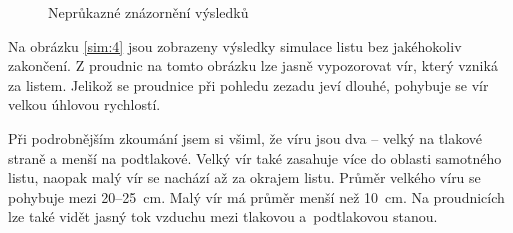 \begin{figure}[H]
		\caption{Neprůkazné znázornění výsledků}
	\end{figure}


Na obrázku \ref{sim:4} jsou zobrazeny výsledky simulace listu bez jakéhokoliv zakončení. Z proudnic na tomto obrázku lze jasně vypozorovat vír, který vzniká za listem. Jelikož se proudnice při pohledu zezadu jeví dlouhé, pohybuje se vír velkou úhlovou rychlostí.

Při podrobnějším zkoumání jsem si všiml, že víru jsou dva – velký na tlakové straně a menší na podtlakové. Velký vír také zasahuje více do oblasti samotného listu, naopak malý vír se nachází až za okrajem listu. Průměr velkého víru se pohybuje mezi 20–25~cm. Malý vír má průměr menší než 10~cm. Na proudnicích lze také vidět jasný tok vzduchu mezi tlakovou a~podtlakovou stanou.


